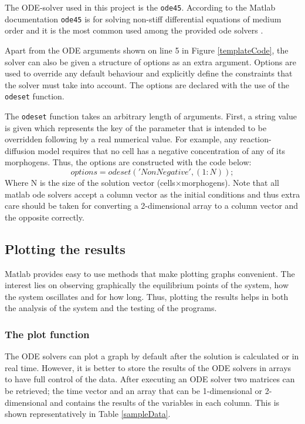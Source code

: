 The ODE-solver used in this project is the \texttt{ode45}. According to the Matlab documentation \texttt{ode45} is for solving non-stiff differential equations of medium order and it is the most common used among the provided ode solvers \cite{MATLAB_2010}.
    
Apart from the ODE arguments shown on line 5 in Figure \ref{templateCode},
    the solver can also be given a structure of options as an extra argument. Options are used to override any default behaviour and explicitly define the constraints that the solver must take into account. The options are declared with the use of the \texttt{odeset} function.
    
The \texttt{odeset} function takes an arbitrary length of arguments. First, a string value is given which represents the key of the parameter that is intended to be overridden following by a real numerical value. For example, any reaction-diffusion model requires that no cell has a negative concentration of any of its morphogens. Thus, the options are constructed with the code below:
    $$ options = odeset('NonNegative',(1:N)); $$
    Where N is the size of the solution vector (cells$\times$morphogens). Note that all matlab ode solvers accept a column vector as the initial conditions and thus extra care should be taken for converting a 2-dimensional array to a column vector and the opposite correctly.
	 
	\subsection{Plotting the results}
    Matlab provides easy to use methods that make plotting graphs convenient. The interest lies on observing graphically the equilibrium points of the system, how the system oscillates and for how long. Thus, plotting the results helps in both the analysis of the system and the testing of the programs.
    \subsubsection{The plot function}
    The ODE solvers can plot a graph by default after the solution is calculated or in real time. However, it is better to store the results of the ODE solvers in arrays to have full control of the data. After executing an ODE solver two matrices can be retrieved; the time vector and an array that can be 1-dimensional or 2-dimensional and contains the results of the variables in each column. This is shown representatively in Table \ref{sampleData}. 

